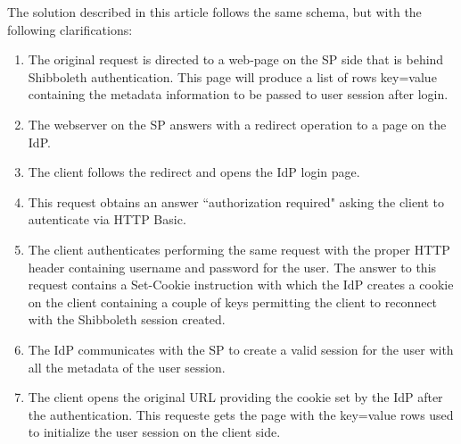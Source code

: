 The solution described in this article follows the same schema, but with the following clarifications:
\begin{enumerate}
\item The original request is directed to a web-page on the SP side that is behind Shibboleth authentication.
This page will produce a list of rows key=value containing the metadata information to be passed to user session after login.
\item The webserver on the SP answers with a redirect operation to a page on the IdP.
\item The client follows the redirect and opens the IdP login page.
\item This request obtains an answer ``authorization required" asking the client to autenticate via HTTP Basic.
\item The client authenticates performing the same request with the proper HTTP header containing username and password for the user.
The answer to this request contains a Set-Cookie instruction with which the IdP creates a cookie on the client containing a couple of
keys permitting the client to reconnect with the Shibboleth session created.
\item The IdP communicates with the SP to create a valid session for the user with all the metadata of the user session.
\item The client opens the original URL providing the cookie set by the IdP after the authentication.
This requeste gets the page with the key=value rows used to initialize the user session on the client side.
\end{enumerate}

